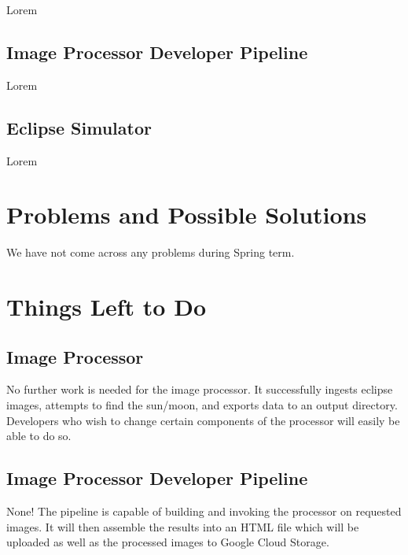 \documentclass[10pt, onecolumn, draftclsnofoot, letterpaper, compsoc]{IEEEtran}
\begin{document}
Lorem \\

\subsection{Image Processor Developer Pipeline}

Lorem \\

\subsection{Eclipse Simulator}

Lorem \\


\section{Problems and Possible Solutions}

We have not come across any problems during Spring term.

\section{Things Left to Do}

\subsection{Image Processor}

No further work is needed for the image processor. It successfully ingests
eclipse images, attempts to find the sun/moon, and exports data to an output
directory. Developers who wish to change certain components of the
processor will easily be able to do so. \\

\subsection{Image Processor Developer Pipeline}

None! The pipeline is capable of building and invoking the processor on requested
images. It will then assemble the results into an HTML file which will be uploaded
as well as the processed images to Google Cloud Storage. \\
\end{document}
